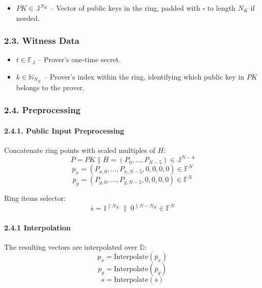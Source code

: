 \documentclass[
]{article}
\providecommand{\tightlist}{%
  \setlength{\itemsep}{0pt}\setlength{\parskip}{0pt}}
\begin{document}
\begin{itemize}
\tightlist
\item
  \(\overline{PK} \in \mathbb{J}^{N_K}\) -- Vector of public keys in the
  ring, padded with \(\square\) to length \(N_K\) if needed.
\end{itemize}

\hypertarget{witness-data}{%
\subsubsection{2.3. Witness Data}\label{witness-data}}

\begin{itemize}
\tightlist
\item
  \(t \in \mathbb{F_J}\) -- Prover's one-time secret.
\item
  \(k \in \mathbb{N}_{N_K}\) -- Prover's index within the ring,
  identifying which public key in \(\overline{PK}\) belongs to the
  prover.
\end{itemize}

\hypertarget{preprocessing}{%
\subsubsection{2.4. Preprocessing}\label{preprocessing}}

\hypertarget{public-input-preprocessing}{%
\paragraph{2.4.1. Public Input
Preprocessing}\label{public-input-preprocessing}}

Concatenate ring points with scaled multiples of \(H\):
\[\overline{P} = \overline{PK} \| \overline{H} = (P_0, \ldots, P_{N-5}) \in \mathbb{J}^{N-4}\]
\[\overline{p}_x = (P_{x,0}, \ldots, P_{x,N-5}, 0, 0, 0, 0) \in \mathbb{F}^N\]
\[\overline{p}_y = (P_{y,0}, \ldots, P_{y,N-5}, 0, 0, 0, 0) \in \mathbb{F}^N\]

Ring items selector:
\[\overline{s} = 1^{\|N_K}\ \|\ 0^{\|N-N_K} \in \mathbb{F}^N\]

\hypertarget{interpolation}{%
\paragraph{2.4.1 Interpolation}\label{interpolation}}

The resulting vectors are interpolated over \(\mathbb{D}\):
\[p_x = \text{Interpolate}(\overline{p}_x)\]
\[p_y = \text{Interpolate}(\overline{p}_y)\]
\[s = \text{Interpolate}(\overline{s})\]
\end{document}
